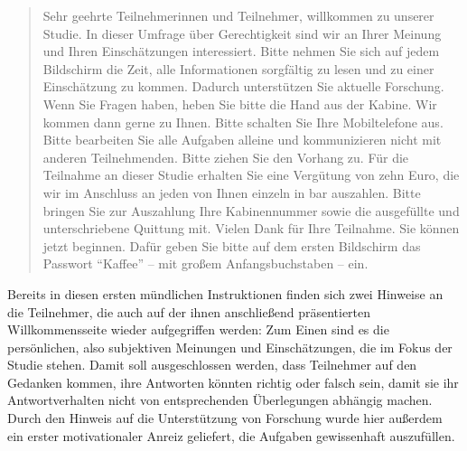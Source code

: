 \documentclass[a4paper]{thesis}
\begin{document}
\begin{quote}
Sehr geehrte Teilnehmerinnen und Teilnehmer, willkommen zu unserer Studie. In dieser Umfrage über Gerechtigkeit sind wir an Ihrer Meinung und Ihren Einschätzungen interessiert. Bitte nehmen Sie sich auf jedem Bildschirm die Zeit, alle Informationen sorgfältig zu lesen und zu einer Einschätzung zu kommen. Dadurch unterstützen Sie aktuelle Forschung. Wenn Sie Fragen haben, heben Sie bitte die Hand aus der Kabine. Wir kommen dann gerne zu Ihnen. Bitte schalten Sie Ihre Mobiltelefone aus. Bitte bearbeiten Sie alle Aufgaben alleine und kommunizieren nicht mit anderen Teilnehmenden. Bitte ziehen Sie den Vorhang zu. Für die Teilnahme an dieser Studie erhalten Sie eine Vergütung von zehn Euro, die wir im Anschluss an jeden von Ihnen einzeln in bar auszahlen. Bitte bringen Sie zur Auszahlung Ihre Kabinennummer sowie die ausgefüllte und unterschriebene Quittung mit. Vielen Dank für Ihre Teilnahme. Sie können jetzt beginnen. Dafür geben Sie bitte auf dem ersten Bildschirm das Passwort \enquote{Kaffee} -- mit großem Anfangsbuchstaben -- ein.
\end{quote}

Bereits in diesen ersten mündlichen Instruktionen finden sich zwei Hinweise an die Teilnehmer, die auch auf der ihnen anschließend präsentierten Willkommensseite wieder aufgegriffen werden: Zum Einen sind es die persönlichen, also subjektiven Meinungen und Einschätzungen, die im Fokus der Studie stehen. Damit soll ausgeschlossen werden, dass Teilnehmer auf den Gedanken kommen, ihre Antworten könnten richtig oder falsch sein, damit sie ihr Antwortverhalten nicht von entsprechenden Überlegungen abhängig machen. Durch den Hinweis auf die Unterstützung von Forschung wurde hier außerdem ein erster motivationaler Anreiz geliefert, die Aufgaben gewissenhaft auszufüllen.
\end{document}
